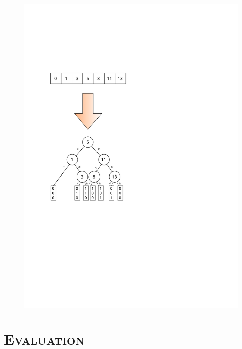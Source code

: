 \documentclass[xcolor=x11names,compress]{beamer}
\renewcommand{\(}{\begin{columns}}
\renewcommand{\)}{\end{columns}}
\newcommand{\<}[1]{\begin{column}{#1}}
\renewcommand{\>}{\end{column}}
\begin{document}
\begin{frame}
  \begin{figure}
  \centering
  \includegraphics[scale=0.6]{figures/array_to_tree}
  \end{figure}
\end{frame}

\section{\scshape Evaluation}
\end{document}
